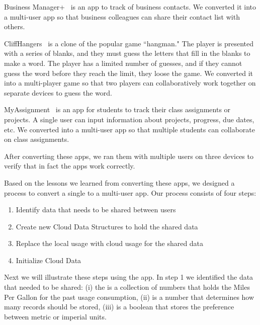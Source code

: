 \documentclass{sigplanconf}
\begin{document}
Business Manager+~\cite{BusinessManager} is an app to track of business contacts.  We converted it into a multi-user app so that business colleagues can share their contact list with others.

CliffHangers~\cite{CliffHangers} is a clone of the popular game ``hangman."  The player is presented with a series of blanks, and they must guess the letters that fill in the blanks to make a word.  The player has a limited number of guesses, and if they cannot guess the word before they reach the limit, they loose the game.  We converted it into a multi-player game so that two players can collaboratively work together on separate devices to guess the word.

MyAssignment~\cite{MyAssignments} is an app for students to track their class assignments or projects.  A single user can input information about projects, progress, due dates, etc.  We converted into a multi-user app so that multiple students can collaborate on class assignments.

After converting these apps, we ran them with multiple users on three devices to verify that in fact the apps work correctly. 

Based on the lessons we learned from converting these \numFormative apps, we designed a process to convert  a single to a multi-user app.  Our process consists of four steps:   
\begin{enumerate}
\item Identify data that needs to be shared between users

\item Create new Cloud Data Structures to hold the shared data

\item Replace the local usage with cloud usage for the shared data

\item Initialize Cloud Data
\end{enumerate}

Next we will illustrate these steps using the \MT app.  In step 1 we identified the data that needed to be shared: 
(i) the  is a collection of numbers that holds the Miles Per Gallon for the past usage consumption, 
(ii)  is a number that determines how many records should be stored, 
(iii)  is a boolean that stores the preference between metric or imperial units.
   
\end{document}
